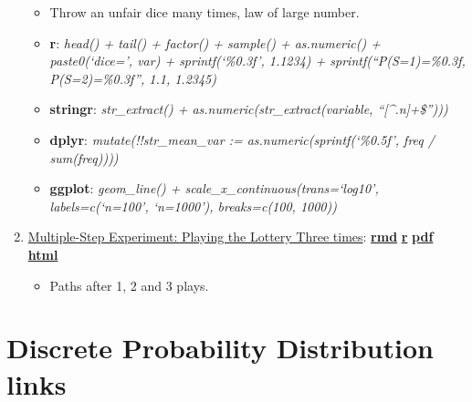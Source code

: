 \documentclass[
]{book}
\providecommand{\tightlist}{%
  \setlength{\itemsep}{0pt}\setlength{\parskip}{0pt}}
\begin{document}
\begin{enumerate}
  \begin{itemize}
  \tightlist
  \item
    Throw an unfair dice many times, law of large number.
  \item
    \textbf{r}: \emph{head() + tail() + factor() + sample() + as.numeric() + paste0(`dice=', var) + sprintf(`\%0.3f', 1.1234) + sprintf(``P(S=1)=\%0.3f, P(S=2)=\%0.3f'', 1.1, 1.2345)}
  \item
    \textbf{stringr}: \emph{str\_extract() + as.numeric(str\_extract(variable, ``{[}\^{}.n{]}+\$'')))}
  \item
    \textbf{dplyr}: \emph{mutate(!!str\_mean\_var := as.numeric(sprintf(`\%0.5f', freq / sum(freq))))}
  \item
    \textbf{ggplot}: \emph{geom\_line() + scale\_x\_continuous(trans=`log10', labels=c(`n=100', `n=1000'), breaks=c(100, 1000))}
  \end{itemize}
\item
  \href{https://fanwangecon.github.io/Stat4Econ/probability/htmlpdfr/lottery.html}{Multiple-Step Experiment: Playing the Lottery Three times}: \href{https://github.com/FanWangEcon/Stat4Econ/blob/master/probability//lottery.Rmd}{\textbf{rmd}} \textbar{} \href{https://github.com/FanWangEcon/Stat4Econ/blob/master/probability/htmlpdfr/lottery.R}{\textbf{r}} \textbar{} \href{https://github.com/FanWangEcon/Stat4Econ/blob/master/probability/htmlpdfr/lottery.pdf}{\textbf{pdf}} \textbar{} \href{https://fanwangecon.github.io/Stat4Econ/probability/htmlpdfr/lottery.html}{\textbf{html}}

  \begin{itemize}
  \tightlist
  \item
    Paths after 1, 2 and 3 plays.
  \end{itemize}
\end{enumerate}

\hypertarget{discrete-probability-distribution-links}{%
\section{Discrete Probability Distribution links}\label{discrete-probability-distribution-links}}
\end{document}
